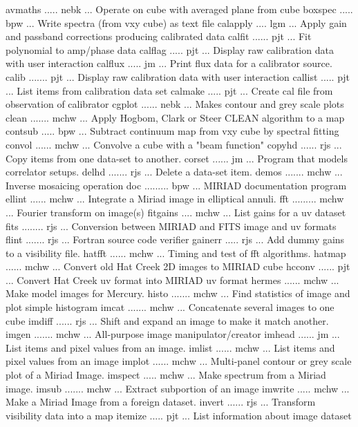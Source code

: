 {\eightpoint\begintt
avmaths ..... nebk ... Operate on cube with averaged plane from cube 
boxspec ..... bpw  ... Write spectra (from vxy cube) as text file 
calapply .... lgm  ... Apply gain and passband corrections producing calibrated data
calfit ...... pjt  ... Fit polynomial to amp/phase data 
calflag ..... pjt  ... Display raw calibration data with user interaction 
\endtt}
{\eightpoint\begintt
calflux ..... jm   ... Print flux data for a calibrator source. 
calib ....... pjt  ... Display raw calibration data with user interaction 
callist ..... pjt  ... List items from calibration data set 
calmake ..... pjt  ... Create cal file from observation of calibrator 
cgplot ...... nebk ... Makes contour and grey scale plots 
\endtt}
{\eightpoint\begintt
clean ....... mchw ... Apply Hogbom, Clark or Steer CLEAN algorithm to a map 
contsub ..... bpw  ... Subtract continuum map from vxy cube by spectral fitting 
convol ...... mchw ... Convolve a cube with a "beam function" 
copyhd ...... rjs  ... Copy items from one data-set to another. 
corset ...... jm   ... Program that models correlator setups. 
\endtt}
{\eightpoint\begintt
delhd ....... rjs  ... Delete a data-set item. 
demos ....... mchw ... Inverse mosaicing operation 
doc ......... bpw  ... MIRIAD documentation program 
ellint ...... mchw ... Integrate a Miriad image in elliptical annuli. 
fft ......... mchw ... Fourier transform on image(s) 
\endtt}
{\eightpoint\begintt
fitgains .... mchw ... List gains for a uv dataset 
fits ........ rjs  ... Conversion between MIRIAD and FITS image and uv formats 
flint ....... rjs  ... Fortran source code verifier 
gainerr ..... rjs  ... Add dummy gains to a visibility file. 
hatfft ...... mchw ... Timing and test of fft algorithms. 
\endtt}
{\eightpoint\begintt
hatmap ...... mchw ... Convert old Hat Creek 2D images to MIRIAD cube 
hcconv ...... pjt  ... Convert Hat Creek uv format into MIRIAD uv format 
hermes ...... mchw ... Make model images for Mercury. 
histo ....... mchw ... Find statistics of image and plot simple histogram 
imcat ....... mchw ... Concatenate several images to one cube 
\endtt}
{\eightpoint\begintt
imdiff ...... rjs  ... Shift and expand an image to make it match another. 
imgen ....... mchw ... All-purpose image manipulator/creator 
imhead ...... jm   ... List items and pixel values from an image. 
imlist ...... mchw ... List items and pixel values from an image 
implot ...... mchw ... Multi-panel contour or grey scale plot of a Miriad Image.
\endtt}
{\eightpoint\begintt
imspect ..... mchw ... Make spectrum from a Miriad image. 
imsub ....... mchw ... Extract subportion of an image 
imwrite ..... mchw ... Make a Miriad Image from a foreign dataset.
invert ...... rjs  ... Transform visibility data into a map 
itemize ..... pjt  ... List information about image dataset 
\endtt}

